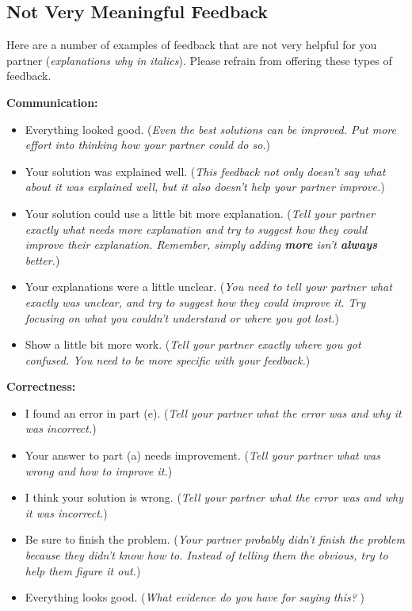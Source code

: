 \documentclass[letter]{article}
\begin{document}
	\subsection*{Not Very Meaningful Feedback}
		Here are a number of examples of feedback that are not very helpful for you partner 
		(\emph{explanations why in
		italics}). Please refrain from offering these types of feedback.

		{\bf Communication:}
	\begin{itemize}
		\item Everything looked good. (\emph{Even the best
		solutions can be improved. Put more effort into
		thinking how
			your partner could do so.})

		\item Your solution was explained well. (\emph{This
		feedback not only doesn't say what about it was explained
			well, but it also doesn't help your partner
			improve.})

		\item Your solution could use a little bit more
		explanation. (\emph{Tell your partner exactly what
		needs more explanation and try to suggest how they could
		improve their explanation. Remember, simply adding \textbf{more}
		isn't \textbf{always} better.})

		\item Your explanations were a little unclear. (\emph{You need
		to tell your partner what exactly was unclear, and try
		to suggest how they could improve it. Try focusing on
		what you couldn't understand or where you got lost.})

		\item Show a little bit more work. (\emph{Tell your partner
		exactly where you got confused. You need to be more
		specific with your feedback.})
	\end{itemize}

	{\bf Correctness:}
	\begin{itemize}
		\item I found an error in part (e). (\emph{Tell your partner what the error was and why it was incorrect.})
		\item Your answer to part (a) needs improvement. (\emph{Tell your partner what was wrong and how to improve
			it.})
		\item I think your solution is wrong. (\emph{Tell your partner what the error was and why it was incorrect.})
		\item Be sure to finish the problem. (\emph{Your partner probably didn't finish the problem because they didn't
			know how to. Instead of telling them the obvious, try to help them figure it out.})
		\item Everything looks good. (\emph{What evidence do you have for saying this? })
	\end{itemize}
\end{document}
